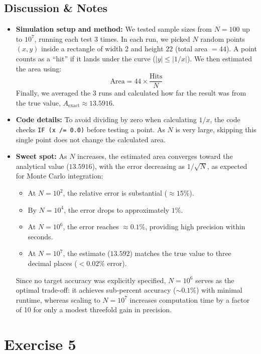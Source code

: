 \documentclass[11pt,a4paper]{article}
\begin{document}
\subsection{Discussion \& Notes}
\begin{itemize}
  \item \textbf{Simulation setup and method:} 
  We tested sample sizes from $N = 100$ up to $10^7$, running each test $3$ times. In each run, we picked $N$ random points $(x, y)$ inside a rectangle of width $2$ and height $22$ (total area $= 44$). A point counts as a ``hit'' if it lands under the curve ($|y| \le |1/x|$). We then estimated the area using:
  \[
  \text{Area} = 44 \times \frac{\text{Hits}}{N}
  \]
  Finally, we averaged the $3$ runs and calculated how far the result was from the true value, $A_{\text{exact}} \approx 13.5916$.

  \item \textbf{Code details:} 
  To avoid dividing by zero when calculating $1/x$, the code checks \texttt{IF (x /= 0.0)} before testing a point. As $N$ is very large, skipping this single point does not change the calculated area.
  
  \item \textbf{Sweet spot:}
  As $N$ increases, the estimated area converges toward the analytical value ($13.5916$), with the error decreasing as $1/\sqrt{N}$, as expected for Monte Carlo integration:
  \begin{itemize}
    \item At $N = 10^2$, the relative error is substantial ($\approx 15\%$).
    \item By $N = 10^4$, the error drops to approximately $1\%$.
    \item At $N = 10^6$, the error reaches $\approx 0.1\%$, providing high precision within seconds.
    \item At $N = 10^7$, the estimate ($13.592$) matches the true value to three decimal places ($< 0.02\%$ error).
  \end{itemize}
  Since no target accuracy was explicitly specified, $N = 10^6$ serves as the optimal trade-off: it achieves sub-percent accuracy ($\sim 0.1\%$) with minimal runtime, whereas scaling to $N = 10^7$ increases computation time by a factor of 10 for only a modest threefold gain in precision.\end{itemize}
\newpage
\newpage
\section{Exercise 5}
\end{document}
